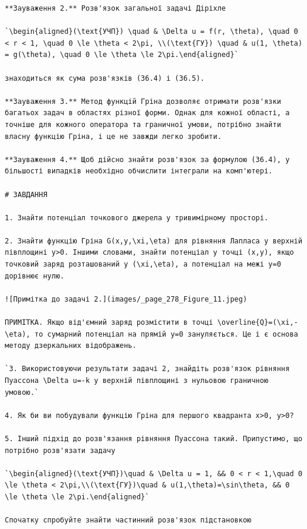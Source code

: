 \documentclass[
  ukrainian,
]{article}
\begin{document}
\begin{verbatim}
**Зауваження 2.** Розв'язок загальної задачі Діріхле

`\begin{aligned}(\text{УЧП}) \quad & \Delta u = f(r, \theta), \quad 0 < r < 1, \quad 0 \le \theta < 2\pi, \\(\text{ГУ}) \quad & u(1, \theta) = g(\theta), \quad 0 \le \theta \le 2\pi.\end{aligned}`

знаходиться як сума розв'язків (36.4) і (36.5).

**Зауваження 3.** Метод функцій Гріна дозволяє отримати розв'язки багатьох задач в областях різної форми. Однак для кожної області, а точніше для кожного оператора та граничної умови, потрібно знайти власну функцію Гріна, і це не завжди легко зробити.

**Зауваження 4.** Щоб дійсно знайти розв'язок за формулою (36.4), у більшості випадків необхідно обчислити інтеграли на комп'ютері.

# ЗАВДАННЯ

1. Знайти потенціал точкового джерела у тривимірному просторі.

2. Знайти функцію Гріна G(x,y,\xi,\eta) для рівняння Лапласа у верхній півплощині y>0. Іншими словами, знайти потенціал у точці (x,y), якщо точковий заряд розташований у (\xi,\eta), а потенціал на межі y=0 дорівнює нулю.

![Примітка до задачі 2.](images/_page_278_Figure_11.jpeg)

ПРИМІТКА. Якщо від'ємний заряд розмістити в точці \overline{Q}=(\xi,-\eta), то сумарний потенціал на прямій y=0 зануляється. Це і є основа методу дзеркальних відображень.

`3. Використовуючи результати задачі 2, знайдіть розв'язок рівняння Пуассона \Delta u=-k у верхній півплощині з нульовою граничною умовою.`

4. Як би ви побудували функцію Гріна для першого квадранта x>0, y>0?

5. Інший підхід до розв'язання рівняння Пуассона такий. Припустимо, що потрібно розв'язати задачу

`\begin{aligned}(\text{УЧП})\quad & \Delta u = 1, && 0 < r < 1,\quad 0 \le \theta < 2\pi,\\(\text{ГУ})\quad & u(1,\theta)=\sin\theta, && 0 \le \theta \le 2\pi.\end{aligned}`

Спочатку спробуйте знайти частинний розв'язок підстановкою
\end{verbatim}
\end{document}
